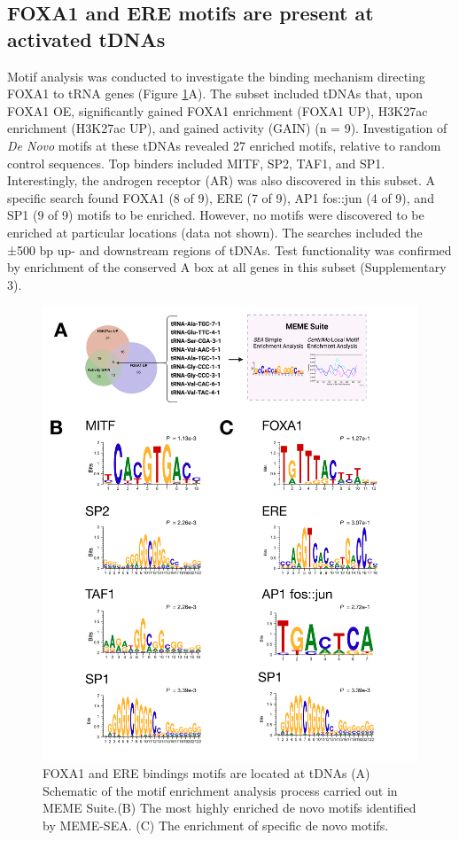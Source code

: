\documentclass[
  12pt,
]{article}
\begin{document}
\hypertarget{foxa1-and-ere-motifs-are-present-at-activated-tdnas}{%
\subsection{FOXA1 and ERE motifs are present at activated tDNAs}\label{foxa1-and-ere-motifs-are-present-at-activated-tdnas}}

Motif analysis was conducted to investigate the binding mechanism directing FOXA1 to tRNA genes (Figure \ref{fig:results-5}A).
The subset included tDNAs that, upon FOXA1 OE, significantly gained FOXA1 enrichment (FOXA1 UP), H3K27ac enrichment (H3K27ac UP), and gained activity (GAIN) (n = 9).
Investigation of \emph{De Novo} motifs at these tDNAs revealed 27 enriched motifs, relative to random control sequences.
Top binders included MITF, SP2, TAF1, and SP1.
Interestingly, the androgen receptor (AR) was also discovered in this subset.
A specific search found FOXA1 (8 of 9), ERE (7 of 9), AP1 fos::jun (4 of 9), and SP1 (9 of 9) motifs to be enriched.
However, no motifs were discovered to be enriched at particular locations (data not shown).
The searches included the ±500 bp up- and downstream regions of tDNAs.
Test functionality was confirmed by enrichment of the conserved A box at all genes in this subset (Supplementary 3).

\begin{figure}[p]
\includegraphics[width=1\linewidth]{../images/results-05} \caption{FOXA1 and ERE bindings motifs are located at tDNAs (A) Schematic of the motif enrichment analysis process carried out in MEME Suite.(B) The most highly enriched de novo motifs identified by MEME-SEA. (C) The enrichment of specific de novo motifs.}\label{fig:results-5}
\end{figure}
\end{document}
